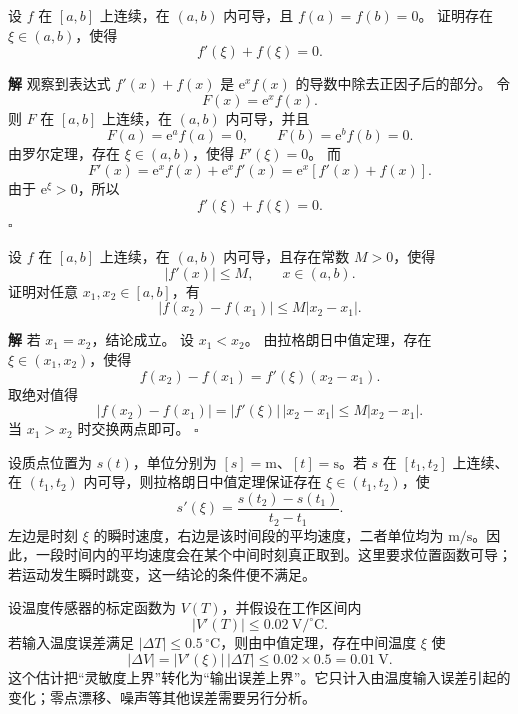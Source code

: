 \documentclass[fontset=fandol]{ctexart}
\newenvironment{solution}{\par\noindent\textbf{解}\quad}{\hfill$\square$\par\vspace{0.8em}}
\newcommand{\ee}{\mathrm{e}}
\begin{document}
\begin{example}[构造辅助函数]
设 $f$ 在 $[a,b]$ 上连续，在 $(a,b)$ 内可导，且 $f(a)=f(b)=0$。 证明存在 $\xi\in(a,b)$，使得
\[
f'(\xi)+f(\xi)=0.
\]
\end{example}
\begin{solution}
观察到表达式 $f'(x)+f(x)$ 是 $\ee^x f(x)$ 的导数中除去正因子后的部分。 令
\[
F(x)=\ee^x f(x).
\]
则 $F$ 在 $[a,b]$ 上连续，在 $(a,b)$ 内可导，并且
\[
F(a)=\ee^a f(a)=0,\qquad F(b)=\ee^b f(b)=0.
\]
由罗尔定理，存在 $\xi\in(a,b)$，使得 $F'(\xi)=0$。 而
\[
F'(x)=\ee^x f(x)+\ee^x f'(x)=\ee^x[f'(x)+f(x)].
\]
由于 $\ee^\xi>0$，所以
\[
f'(\xi)+f(\xi)=0.
\]
\end{solution}

\begin{example}[由导数界估计函数增量]
设 $f$ 在 $[a,b]$ 上连续，在 $(a,b)$ 内可导，且存在常数 $M>0$，使得
\[
|f'(x)|\leq M,\qquad x\in(a,b).
\]
证明对任意 $x_1,x_2\in[a,b]$，有
\[
|f(x_2)-f(x_1)|\leq M|x_2-x_1|.
\]
\end{example}
\begin{solution}
若 $x_1=x_2$，结论成立。 设 $x_1<x_2$。 由拉格朗日中值定理，存在 $\xi\in(x_1,x_2)$，使得
\[
f(x_2)-f(x_1)=f'(\xi)(x_2-x_1).
\]
取绝对值得
\[
|f(x_2)-f(x_1)|=|f'(\xi)|\,|x_2-x_1|\leq M|x_2-x_1|.
\]
当 $x_1>x_2$ 时交换两点即可。
\end{solution}

\begin{application}[物理：平均速度与瞬时速度]
设质点位置为 $s(t)$，单位分别为 $[s]=\mathrm m$、$[t]=\mathrm s$。若 $s$ 在 $[t_1,t_2]$ 上连续、在 $(t_1,t_2)$ 内可导，则拉格朗日中值定理保证存在 $\xi\in(t_1,t_2)$，使
\[
s'(\xi)=\frac{s(t_2)-s(t_1)}{t_2-t_1}.
\]
左边是时刻 $\xi$ 的瞬时速度，右边是该时间段的平均速度，二者单位均为 $\mathrm{m/s}$。因此，一段时间内的平均速度会在某个中间时刻真正取到。这里要求位置函数可导；若运动发生瞬时跳变，这一结论的条件便不满足。
\end{application}

\begin{application}[工程：传感器误差上界]
设温度传感器的标定函数为 $V(T)$，并假设在工作区间内
\[
|V'(T)|\leq0.02\ \mathrm{V/^{\circ}C}.
\]
若输入温度误差满足 $|\Delta T|\leq0.5\,^{\circ}\mathrm C$，则由中值定理，存在中间温度 $\xi$ 使
\[
|\Delta V|=|V'(\xi)|\,|\Delta T|
\leq0.02\times0.5
=0.01\ \mathrm V.
\]
这个估计把“灵敏度上界”转化为“输出误差上界”。它只计入由温度输入误差引起的变化；零点漂移、噪声等其他误差需要另行分析。
\end{application}
\end{document}
